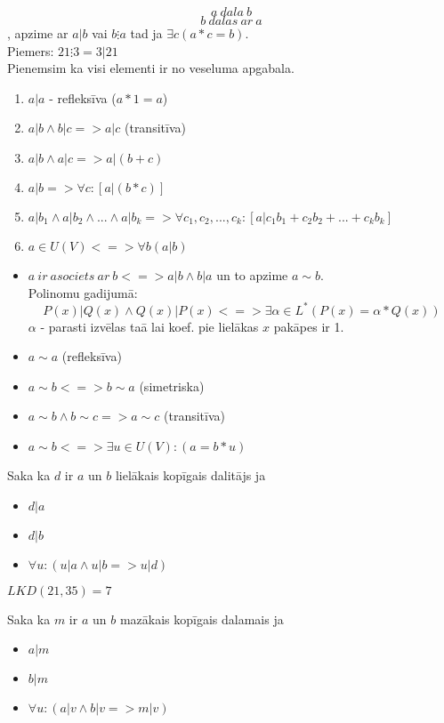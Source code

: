 $$a \ dala \ b $$
$$b \ dalas \ ar \ a$$, 
apzime ar $a | b$ vai $b \vdots a$ tad ja $\exists c (a * c = b)$. \\
Piemers: $21 \vdots 3 = 3 | 21$ \\

Pienemsim ka visi elementi ir no veseluma apgabala.\\
\begin{enumerate}
  \item $a | a $ - refleksīva ($a * 1 = a$)
  \item $a | b \wedge b | c => a | c $ (transitīva)
  \item $a | b \wedge a | c => a | (b+c)$
  \item $a | b => \forall c: [a | (b * c)]$
  \item $ a | b_1 \wedge a | b_2 \wedge ... \wedge a | b_k =>
    \forall c_1, c_2, ..., c_k: [a | c_1b_1 + c_2b_2 + ... + c_k b_k]$
  \item $a \in U(V) <=> \forall b (a |b)$ 
\end{enumerate}




\begin{itemize}
  \item $a \ ir \ asociets \ ar \ b <=> a | b \wedge b | a$
  un to apzime $a \sim b$.  \\
  Polinomu gadijumā: 
  $$P(x) | Q(x) \wedge Q(x) | P(x) <=> \exists \alpha \in L^* (P(x) = \alpha * Q(x))$$
  $\alpha$ - parasti izvēlas taā lai koef. pie lielākas $x$ pakāpes ir 1.

  \item $a \sim a $ (refleksīva)
  \item $a \sim b <=> b \sim a $ (simetriska)
  \item $a \sim b \wedge b \sim c => a \sim c$ (transitīva)
  \item $a \sim b <=> \exists u \in U(V): (a = b * u)$
\end{itemize}

Saka ka $d$ ir $a$ un $b$ lielākais kopīgais dalitājs  ja
\begin{itemize}
  \item $d | a$
  \item $d | b$
  \item $\forall u: (u | a \wedge u | b => u | d)$
\end{itemize}
$LKD(21, 35)=7$

Saka ka $m$ ir $a$ un $b$ mazākais kopīgais dalamais  ja
\begin{itemize}
  \item $a | m$
  \item $b | m$
  \item $\forall u: (a | v \wedge b | v => m | v)$
\end{itemize}

